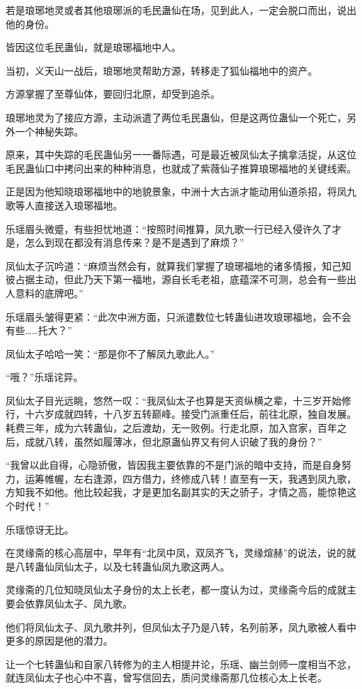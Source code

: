 \begin{this_body}
若是琅琊地灵或者其他琅琊派的毛民蛊仙在场，见到此人，一定会脱口而出，说出他的身份。

皆因这位毛民蛊仙，就是琅琊福地中人。

当初，义天山一战后，琅琊地灵帮助方源，转移走了狐仙福地中的资产。

方源掌握了至尊仙体，要回归北原，却受到追杀。

琅琊地灵为了接应方源，主动派遣了两位毛民蛊仙，但是这两位蛊仙一个死亡，另外一个神秘失踪。

原来，其中失踪的毛民蛊仙另一一番际遇，可是最近被凤仙太子擒拿活捉，从这位毛民蛊仙口中拷问出来的种种消息，也就成了紫薇仙子推算琅琊福地的关键线索。

正是因为他知晓琅琊福地中的地貌景象，中洲十大古派才能动用仙道杀招，将凤九歌等人直接送入琅琊福地。

乐瑶眉头微蹙，有些担忧地道：“按照时间推算，凤九歌一行已经入侵许久了才是，怎么到现在都没有消息传来？是不是遇到了麻烦？”

凤仙太子沉吟道：“麻烦当然会有，就算我们掌握了琅琊福地的诸多情报，知己知彼占据主动，但此乃天下第一福地，源自长毛老祖，底蕴深不可测，总会有一些出人意料的底牌吧。”

乐瑶眉头皱得更紧：“此次中洲方面，只派遣数位七转蛊仙进攻琅琊福地，会不会有些……托大？”

凤仙太子哈哈一笑：“那是你不了解凤九歌此人。”

“哦？”乐瑶诧异。

凤仙太子目光远眺，悠然一叹：“我凤仙太子也算是天资纵横之辈，十三岁开始修行，十六岁成就四转，十八岁五转巅峰。接受门派重任后，前往北原，独自发展。耗费三年，成为六转蛊仙，之后渡劫，无一败例。行走北原，加入宫家，百年之后，成就八转，虽然如履薄冰，但北原蛊仙界又有何人识破了我的身份？”

“我曾以此自得，心隐骄傲，皆因我主要依靠的不是门派的暗中支持，而是自身努力，运筹帷幄，左右逢源，四方借力，终修成八转！直至有一天，我遇到凤九歌，方知我不如他。他比较起我，才是更加名副其实的天之骄子，才情之高，能惊艳这个时代！”

乐瑶惊讶无比。

在灵缘斋的核心高层中，早年有“北凤中凤，双凤齐飞，灵缘煊赫”的说法，说的就是八转蛊仙凤仙太子，以及七转蛊仙凤九歌这两人。

灵缘斋的几位知晓凤仙太子身份的太上长老，都一度认为过，灵缘斋今后的成就主要会依靠凤仙太子、凤九歌。

他们将凤仙太子、凤九歌并列，但凤仙太子乃是八转，名列前茅，凤九歌被人看中更多的原因是他的潜力。

让一个七转蛊仙和自家八转修为的主人相提并论，乐瑶、幽兰剑师一度相当不忿，就连凤仙太子也心中不喜，曾写信回去，质问灵缘斋那几位核心太上长老。


\end{this_body}
